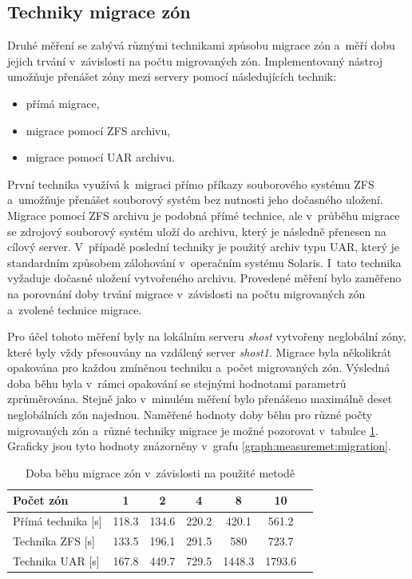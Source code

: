 \subsection{Techniky migrace zón}
\label{chapter:measurement:migration}
Druhé měření se zabývá různými technikami způsobu migrace zón a~měří dobu jejich trvání v~závislosti na počtu migrovaných zón.
Implementovaný nástroj umožňuje přenášet zóny mezi servery pomocí následujících technik:
\begin{itemize}
 \item přímá migrace,
 \item migrace pomocí ZFS archivu,
 \item migrace pomocí UAR archivu.
\end{itemize}
První technika využívá k~migraci přímo příkazy souborového systému ZFS a~umožňuje přenášet souborový systém bez nutnosti jeho dočasného
uložení. Migrace pomocí ZFS archivu je podobná přímé technice, ale v~průběhu migrace se zdrojový souborový systém uloží do archivu,
který je následně přenesen na cílový server. V~případě poslední techniky je použitý archiv typu UAR, který je standardním způsobem zálohování
v~operačním systému Solaris. I~tato technika vyžaduje dočasné uložení vytvořeného archivu. Provedené měření bylo zaměřeno
na porovnání doby trvání migrace v~závislosti na počtu migrovaných zón a~zvolené technice migrace.

Pro účel tohoto měření byly na lokálním serveru \textit{shost} vytvořeny neglobální zóny, které byly vždy přesouvány na vzdálený
server \textit{shost1}. Migrace byla několikrát opakována pro každou zmíněnou techniku a~počet migrovaných zón. Výsledná
doba běhu byla v~rámci opakování se stejnými hodnotami parametrů zprůměrována. Stejně jako v~minulém měření bylo přenášeno maximálně
deset neglobálních zón najednou. Naměřené hodnoty doby běhu pro různé počty migrovaných zón a~různé techniky migrace je možné
pozorovat v~tabulce \ref{table:measuremet:migration}. Graficky jsou tyto hodnoty znázorněny v~grafu \ref{graph:measuremet:migration}.
\begin{table}
  \centering
  \caption{Doba běhu migrace zón v~závislosti na použité metodě}
  \begin{tabular}{ l | c c c c c c}
   Počet zón & 1 & 2 & 4 & 8 & 10 &   \\ \hline
   Přímá technika [s] & 118.3 & 134.6 & 220.2 & 420.1 & 561.2 & \\
   Technika ZFS [s] & 133.5 & 196.1 & 291.5 & 580 & 723.7 & \\
   Technika UAR [s] & 167.8 & 449.7 & 729.5 & 1448.3 & 1793.6 & \\
  \end{tabular}
  \label{table:measuremet:migration}
\end{table}

